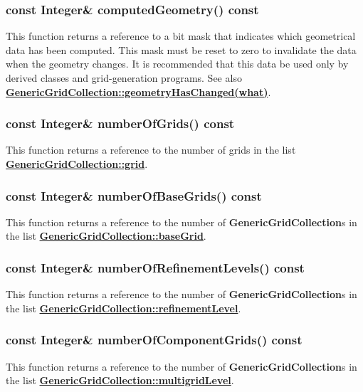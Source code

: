 \documentclass{article}
\begin{document}
  \subsubsection{const Integer\& computedGeometry() const}
  \label{GenericGridCollection::computedGeometry() const}
    This function returns a reference to a bit mask that indicates which geometrical data has been computed.
    This mask must be reset to zero to invalidate the data when the geometry changes.
    It is recommended that this data be used only by derived classes
    and grid-generation programs.
    See also {\bf{}\hyperref{geometryHasChanged(what)}{geometryHasChanged(what) \rm(\S}{)}{GenericGridCollection::geometryHasChanged(what)}}.

  \subsubsection{const Integer\& numberOfGrids() const}
  \label{GenericGridCollection::numberOfGrids() const}
    This function returns a reference to the number of grids in the list {\bf{}\hyperref{grid}{grid \rm(\S}{)}{GenericGridCollection::grid}}.

  \subsubsection{const Integer\& numberOfBaseGrids() const}
  \label{GenericGridCollection::numberOfBaseGrids() const}
    This function returns a reference to the number of \textbf{GenericGridCollection}s in
    the list {\bf{}\hyperref{baseGrid}{baseGrid \rm(\S}{)}{GenericGridCollection::baseGrid}}.

  \subsubsection{const Integer\& numberOfRefinementLevels() const}
  \label{GenericGridCollection::numberOfRefinementLevels() const}
    This function returns a reference to the number of \textbf{GenericGridCollection}s in the list
    {\bf{}\hyperref{refinementLevel}{refinementLevel \rm(\S}{)}{GenericGridCollection::refinementLevel}}.

  \subsubsection{const Integer\& numberOfComponentGrids() const}
  \label{GenericGridCollection::numberOfComponentGrids() const}
    This function returns a reference to the number of \textbf{GenericGridCollection}s in the list
    {\bf{}\hyperref{multigridLevel}{multigridLevel \rm(\S}{)}{GenericGridCollection::multigridLevel}}.
\end{document}
